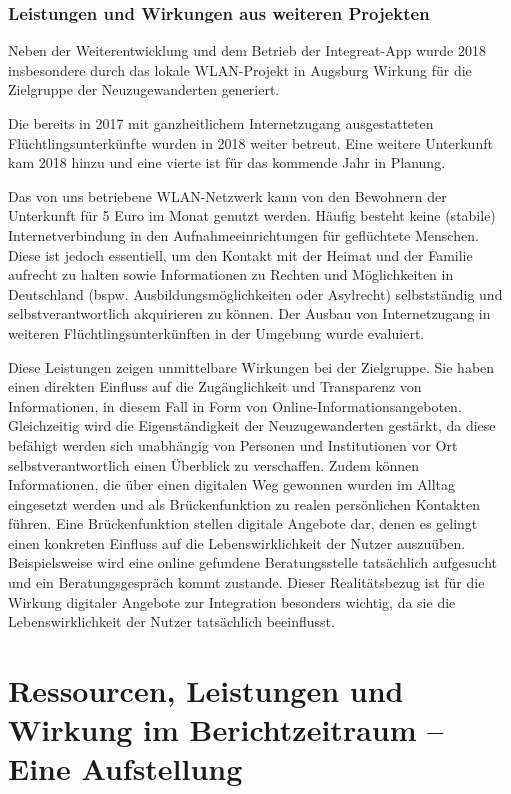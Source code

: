 \documentclass[12pt, a4paper]{article} %
\begin{document}
\hypertarget{leistungen-und-wirkungen-aus-weiteren-projekten}{%
\subsubsection{Leistungen und Wirkungen aus weiteren
Projekten}\label{leistungen-und-wirkungen-aus-weiteren-projekten}}

Neben der Weiterentwicklung und dem Betrieb der Integreat-App wurde 2018
insbesondere durch das lokale WLAN-Projekt in Augsburg Wirkung für die
Zielgruppe der Neuzugewanderten generiert.

Die bereits in 2017 mit ganzheitlichem Internetzugang ausgestatteten
Flüchtlingsunterkünfte wurden in 2018 weiter betreut. Eine weitere
Unterkunft kam 2018 hinzu und eine vierte ist für das kommende Jahr in
Planung.

Das von uns betriebene WLAN-Netzwerk kann von den Bewohnern der
Unterkunft für 5 Euro im Monat genutzt werden. Häufig besteht keine
(stabile) Internetverbindung in den Aufnahmeeinrichtungen für
geflüchtete Menschen. Diese ist jedoch essentiell, um den Kontakt mit
der Heimat und der Familie aufrecht zu halten sowie Informationen zu
Rechten und Möglichkeiten in Deutschland (bspw. Ausbildungsmöglichkeiten
oder Asylrecht) selbstständig und selbstverantwortlich akquirieren zu
können. Der Ausbau von Internetzugang in weiteren
Flüchtlingsunterkünften in der Umgebung wurde evaluiert.

Diese Leistungen zeigen unmittelbare Wirkungen bei der Zielgruppe. Sie
haben einen direkten Einfluss auf die Zugänglichkeit und Transparenz von
Informationen, in diesem Fall in Form von Online-Informationsangeboten.
Gleichzeitig wird die Eigenständigkeit der Neuzugewanderten gestärkt, da
diese befähigt werden sich unabhängig von Personen und Institutionen vor
Ort selbstverantwortlich einen Überblick zu verschaffen. Zudem können
Informationen, die über einen digitalen Weg gewonnen wurden im Alltag
eingesetzt werden und als Brückenfunktion zu realen persönlichen
Kontakten führen. Eine Brückenfunktion stellen digitale Angebote dar,
denen es gelingt einen konkreten Einfluss auf die Lebenswirklichkeit der
Nutzer auszuüben. Beispielsweise wird eine online gefundene
Beratungsstelle tatsächlich aufgesucht und ein Beratungsgespräch kommt
zustande. Dieser Realitätsbezug ist für die Wirkung digitaler Angebote
zur Integration besonders wichtig, da sie die Lebenswirklichkeit der
Nutzer tatsächlich beeinflusst.

\hypertarget{ressourcen-leistungen-und-wirkung-im-berichtzeitraum-eine-aufstellung}{%
\section{Ressourcen, Leistungen und Wirkung im Berichtzeitraum – Eine
Aufstellung}\label{ressourcen-leistungen-und-wirkung-im-berichtzeitraum-eine-aufstellung}}
\end{document}
